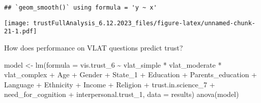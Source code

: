 \documentclass[
]{article}
\newenvironment{Shaded}{\begin{snugshade}}{\end{snugshade}}
\newcommand{\AttributeTok}[1]{\textcolor[rgb]{0.77,0.63,0.00}{#1}}
\newcommand{\FunctionTok}[1]{\textcolor[rgb]{0.00,0.00,0.00}{#1}}
\newcommand{\NormalTok}[1]{#1}
\newcommand{\OtherTok}[1]{\textcolor[rgb]{0.56,0.35,0.01}{#1}}
\newcommand{\SpecialCharTok}[1]{\textcolor[rgb]{0.00,0.00,0.00}{#1}}
\begin{document}
\begin{verbatim}
## `geom_smooth()` using formula = 'y ~ x'
\end{verbatim}

\texttt{[image: trustFullAnalysis\_6.12.2023\_files/figure-latex/unnamed-chunk-21-1.pdf]}

How does performance on VLAT questions predict trust?

\begin{Shaded}
\begin{Highlighting}[]
\NormalTok{model }\OtherTok{\textless{}{-}} \FunctionTok{lm}\NormalTok{(}\AttributeTok{formula =}\NormalTok{ vis.trust\_6 }\SpecialCharTok{\textasciitilde{}}\NormalTok{ vlat\_simple }\SpecialCharTok{*}\NormalTok{ vlat\_moderate }\SpecialCharTok{*}\NormalTok{ vlat\_complex }\SpecialCharTok{+}
\NormalTok{              Age }\SpecialCharTok{+}\NormalTok{ Gender }\SpecialCharTok{+}\NormalTok{ State\_1 }\SpecialCharTok{+}\NormalTok{ Education }\SpecialCharTok{+}\NormalTok{ Parents\_education }\SpecialCharTok{+}\NormalTok{ Language }\SpecialCharTok{+} 
\NormalTok{              Ethnicity }\SpecialCharTok{+}\NormalTok{ Income }\SpecialCharTok{+}\NormalTok{ Religion }\SpecialCharTok{+}\NormalTok{ trust.in.science\_7 }\SpecialCharTok{+} 
\NormalTok{              need\_for\_cognition }\SpecialCharTok{+}\NormalTok{ interpersonal.trust\_1,}
            \AttributeTok{data =}\NormalTok{ results)}
\FunctionTok{anova}\NormalTok{(model)}
\end{Highlighting}
\end{Shaded}
\end{document}
